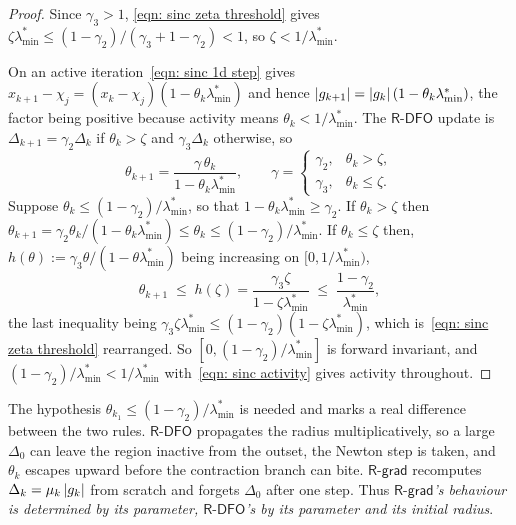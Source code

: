 \documentclass[11pt]{article}
\theoremstyle{plain}
\theoremstyle{definition}
\theoremstyle{remark}
\numberwithin{equation}{section}
\providecommand{\defeq}{\mathrel{:=}}
\newcommand{\Rdfo}{\textsf{R-DFO}}
\newcommand{\Rgrad}{\textsf{R-grad}}
\providecommand{\gtwo}{\gamma_2}
\providecommand{\gthree}{\gamma_3}
\begin{document}
\begin{proof}
    Since $\gthree > 1$, \eqref{eqn: sinc zeta threshold} gives
    $\zeta \lambda^*_{\min} \leq (1-\gtwo)/(\gthree+1-\gtwo) < 1$, so $\zeta < 1/\lambda^*_{\min}$.

    On an active iteration~\eqref{eqn: sinc 1d step} gives
    $x_{k+1} - \chi_j = (x_k - \chi_j)(1 - \theta_k \lambda^*_{\min})$ and hence
    $\left \vert g_{k+1} \right \vert = \left \vert g_k \right \vert(1 - \theta_k \lambda^*_{\min})$, the factor being positive because activity means
    $\theta_k < 1/\lambda^*_{\min}$. The $\Rdfo$ update is $\Delta_{k+1} = \gtwo\Delta_k$ if $\theta_k > \zeta$
    and $\gthree\Delta_k$ otherwise, so
    \begin{equation}
        \theta_{k+1} = \frac{\gamma\,\theta_k}{1 - \theta_k \lambda^*_{\min}},
        \qquad
        \gamma = \begin{cases} \gtwo, & \theta_k > \zeta,\\ \gthree, & \theta_k \leq \zeta.\end{cases}
        \label{eqn: sinc theta map}
    \end{equation}
    Suppose $\theta_k \leq (1-\gtwo)/\lambda^*_{\min}$, so that $1 - \theta_k \lambda^*_{\min} \geq \gtwo$. If
    $\theta_k > \zeta$ then
    $\theta_{k+1} = \gtwo\theta_k/(1-\theta_k \lambda^*_{\min}) \leq \theta_k \leq (1-\gtwo)/\lambda^*_{\min}$. If
    $\theta_k \leq \zeta$ then, $h(\theta) \defeq \gthree\theta/(1-\theta \lambda^*_{\min})$ being increasing on
    $[0,1/\lambda^*_{\min})$,
    \begin{equation*}
        \theta_{k+1} \;\leq\; h(\zeta) = \frac{\gthree\zeta}{1-\zeta \lambda^*_{\min}}
        \;\leq\; \frac{1-\gtwo}{\lambda^*_{\min}} ,
    \end{equation*}
    the last inequality being $\gthree\zeta \lambda^*_{\min} \leq (1-\gtwo)(1-\zeta \lambda^*_{\min})$, which
    is~\eqref{eqn: sinc zeta threshold} rearranged. So $[0, (1-\gtwo)/\lambda^*_{\min}]$ is forward invariant,
    and $(1-\gtwo)/\lambda^*_{\min} < 1/\lambda^*_{\min}$ with~\eqref{eqn: sinc activity} gives activity throughout.
\end{proof}

The hypothesis $\theta_{k_1} \leq (1-\gtwo)/\lambda^*_{\min}$ is needed and marks a real difference between the
two rules. $\Rdfo$ propagates the radius multiplicatively, so a large $\Delta_0$ can leave the
region inactive from the outset, the Newton step is taken, and $\theta_k$ escapes upward before
the contraction branch can bite. $\Rgrad$ recomputes $\Delta_k = \mu_k\left \vert g_k \right \vert$ from scratch and
forgets $\Delta_0$ after one step. Thus \emph{$\Rgrad$'s behaviour is determined by its parameter,
$\Rdfo$'s by its parameter and its initial radius}.
\end{document}
